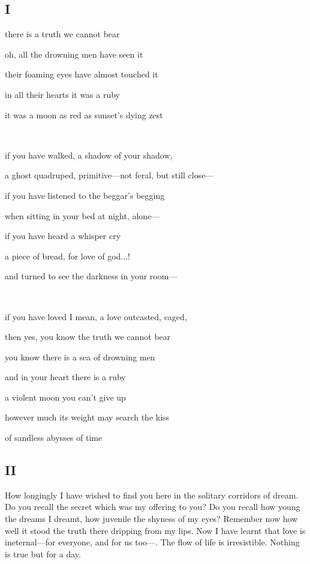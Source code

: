 \documentclass[a4paper, 12pt]{article}
\begin{document}
\subsection{I}

   there is a truth we cannot bear

   oh, all the drowning men have seen it

   their foaming eyes have almost touched it 

   in all their hearts it was a ruby 

   it was a moon as red as sunset's dying zest

   ~ ~ ~ 

   if you have walked, a shadow of your shadow,
   
   a ghost quadruped, primitive---not feral, but still close---

   if you have listened to the beggar's begging

   when sitting in your bed at night, alone--- 

   if you have heard a whisper cry 
   
   a piece of bread, for love of god...!

   and turned to see the darkness in your room---

   ~ ~ ~ 

   if you have loved I mean, a love outcasted, caged,

   then yes, you know the truth we cannot bear 

   you know there is a sea of drowning men 

   and in your heart there is a ruby 

   a violent moon you can't give up

   however much its weight may search the kiss 

   of sandless abysses of time




   \pagebreak

   \subsection{II}

How longingly I have wished to find you here in the solitary corridors of dream.
Do you recall the secret which was my offering to you? Do you recall how young
the dreams I dreamt, how juvenile the shyness of my eyes? Remember now how well
it stood the truth there dripping from my lips. Now I have learnt that love is
ineternal---for everyone, and for us too---. The flow of life is irresistible.
Nothing is true but for a day.
\end{document}
